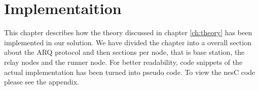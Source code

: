 \chapter{Implementaition}\label{ch:implementation}

This chapter describes how the theory discussed in chapter \ref{ch:theory} has been implemented in our solution. We have divided the chapter into a overall section about the ARQ protocol and then sections per node, that is base station, the relay nodes and the runner node. For better readability, code snippets of the actual implementation has been turned into pseudo code. To view the nesC code please see the appendix.










